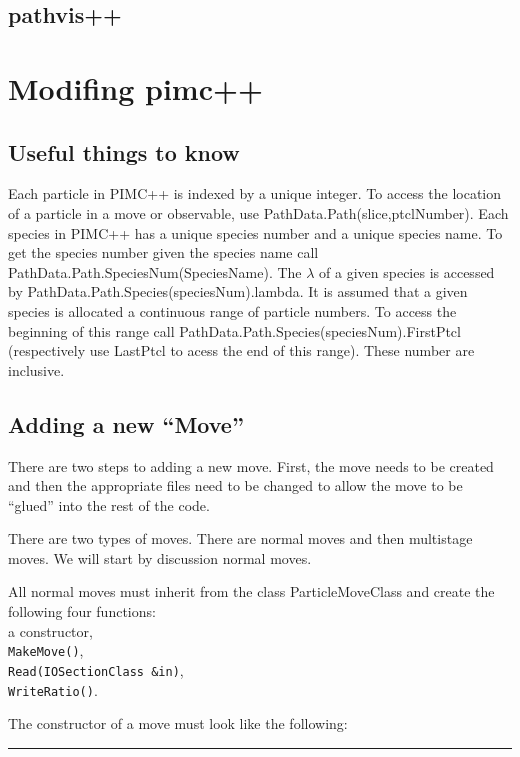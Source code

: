 \documentclass{book}
\begin{document}
\section{pathvis++}


\chapter{Modifing pimc++}
\section{Useful things to know}
Each particle in PIMC++ is indexed by a unique integer.  To access the
location of a particle in a move or observable, use
PathData.Path(slice,ptclNumber). Each species in PIMC++ has a unique
species number and a unique species name.  To get the species number
given the species name call PathData.Path.SpeciesNum(SpeciesName).
The $\lambda$ of a given species is accessed by
PathData.Path.Species(speciesNum).lambda.   It is assumed
that a given species is allocated a continuous range of particle
numbers.  To access the beginning of this range call
PathData.Path.Species(speciesNum).FirstPtcl (respectively use LastPtcl
to acess the end of this range).  These number are inclusive.
\section{Adding a new ``Move''}
There are two steps to adding a new move. First, the move needs to be
created and then the appropriate files need to be changed to allow the
move to be ``glued'' into the rest of the code.

There are two types of moves. There are normal moves and then
multistage moves. We will start by discussion normal moves.


All normal moves must inherit from the class ParticleMoveClass and 
create the following four functions: \\
a constructor,\\
\texttt{MakeMove()},\\
\texttt{Read(IOSectionClass \&in)},  \\
\texttt{WriteRatio()}.


The constructor of a move must look like the following:\\

\rule{0.6cm}{0cm}
\end{document}
